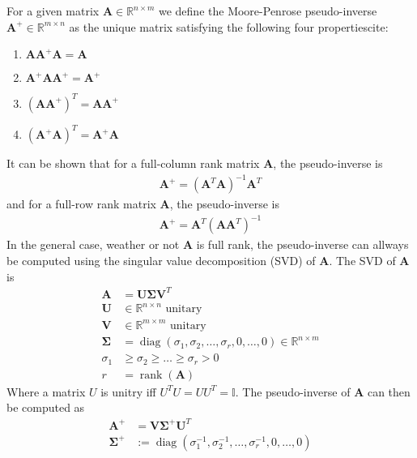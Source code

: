 For a given matrix $\bm{A} \in \mathbb{R}^{n\times m}$ we define the Moore-Penrose
pseudo-inverse $\bm{A}^{+} \in \mathbb{R}^{m\times n}$ as the unique matrix
satisfying the following four properties{\color{red}cite}:
\begin{enumerate}
\item $\bm{A}\bm{A}^{+}\bm{A} = \bm{A}$
\item $\bm{A}^{+}\bm{A}\bm{A}^{+} = \bm{A}^{+}$
\item $(\bm{A}\bm{A}^{+})^T = \bm{A}\bm{A}^{+}$
\item $(\bm{A}^{+}\bm{A})^T = \bm{A}^{+}\bm{A}$
\end{enumerate}
It can be shown that for a full-column rank matrix $\bm{A}$, the pseudo-inverse is
\begin{align}
    \bm{A}^{+} = (\bm{A}^T \bm{A})^{-1} \bm{A}^T
\end{align}
and for a full-row rank matrix $\bm{A}$, the pseudo-inverse is
\begin{align}
    \bm{A}^{+} = \bm{A}^T (\bm{A} \bm{A}^T)^{-1}
\end{align}
In the general case, weather or not $\bm{A}$ is full rank, the pseudo-inverse can allways
be computed using the singular value decomposition (SVD) of $\bm{A}$. The SVD of $\bm{A}$ is
\begin{subequations}
\begin{align}
    \bm{A} &= \bm{U} \bm{\Sigma} \bm{V}^T \\
    \bm{U} &\in \mathbb{R}^{n\times n} \textrm{ unitary} \\
    \bm{V} &\in \mathbb{R}^{m\times m} \textrm{ unitary} \\
    \bm{\Sigma} &= \operatorname{diag}(\sigma_1, \sigma_2, \ldots, \sigma_r, 0, \ldots, 0) \in \mathbb{R}^{n\times m} \\
    \sigma_1 &\geq \sigma_2 \geq \ldots \geq \sigma_r > 0 \\
    r &= \operatorname{rank}(\bm{A})
\end{align}
\end{subequations}
Where a matrix $U$ is unitry iff $U^T U = U U^T = \mathbb{I}$. The pseudo-inverse
of $\bm{A}$ can then be computed as
\begin{subequations}
\begin{align}
    \bm{A}^{+} &= \bm{V} \bm{\Sigma}^{+} \bm{U}^T \\
    \bm{\Sigma}^{+} &:= \operatorname{diag}(\sigma_1^{-1}, \sigma_2^{-1}, \ldots, \sigma_r^{-1}, 0, \ldots, 0)
\end{align}
\end{subequations}

